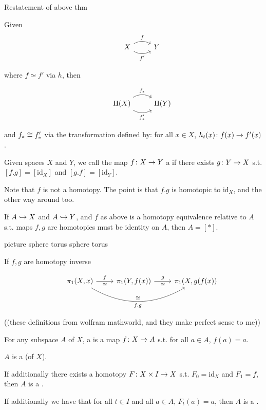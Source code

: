 \documentclass[11pt,leqno,oneside]{amsart}
\numberwithin{thm}{section}
\newcommand{\homotopic}{\simeq}
\newcommand{\fund}{\pi_1}
\newcommand{\x}{\times}
\newcommand{\id}{\text{id}}
\begin{document}
\begin{thm}
  Restatement of above thm

  Given
  $$\begin{tikzcd}
    &X \arrow[r, bend left, "f"] \arrow[r, bend right, "f'"'] &Y
  \end{tikzcd}$$

  where $f \homotopic f'$ via $h$, then

  $$\begin{tikzcd}
    &\Pi(X) \arrow[r, bend left, "f_*"] \arrow[r, bend right, "f_*'"'] &\Pi(Y)
  \end{tikzcd}$$

  and $f_* \mathrel{\cong} f_*'$ via the transformation defined by: for all $x \in X$, $h_t(x)\colon f(x) \to f'(x)$.
\end{thm}
\begin{defn}
  Given spaces $X$ and $Y$, we call the map $f\colon X \to Y$ a  if there exists $g\colon Y \to X$ s.t. $[f.g] = [\id_X]$ and $[g.f] = [\id_Y]$.
\end{defn}
\begin{rmk}
  Note that $f$ is not a homotopy.  The point is that $f.g$ is homotopic to $\id_X$, and the other way around too.
\end{rmk}
\begin{rmk}
  If $A \hookrightarrow X$ and $A \hookrightarrow Y$, and $f$ as above is a homotopy equivalence relative to $A$ s.t. maps $f,g$ are homotopies must be identity on $A$, then $A = [*]$.

  picture
  sphere torus
  sphere torus

  If $f,g$ are homotopy inverse

  $$\begin{tikzcd}
    &\fund(X,x) \arrow[r, "f", "\isom"'] \arrow[rr, bend right, "\isom", "f.g"'] &\fund(Y, f(x)) \arrow[r, "g", "\isom"'] &\fund(X, g(f(x))
  \end{tikzcd}$$
\end{rmk}
\begin{defn}
  ((these definitions from wolfram mathworld, and they make perfect sense to me))

  For any subspace $A$ of $X$, a  is a map $f\colon X \to A$ s.t. for all $a \in A$, $f(a) = a$.

  $A$ is a  (of $X$).

  If additionally there exists a homotopy $F\from X \x I \to X$ s.t. $F_0 = \id_X$ and $F_1 = f$, then $A$ is a .

  If additionally we have that for all $t \in I$ and all $a \in A$, $F_t(a) = a$, then $A$ is a .
\end{defn}
\end{document}
